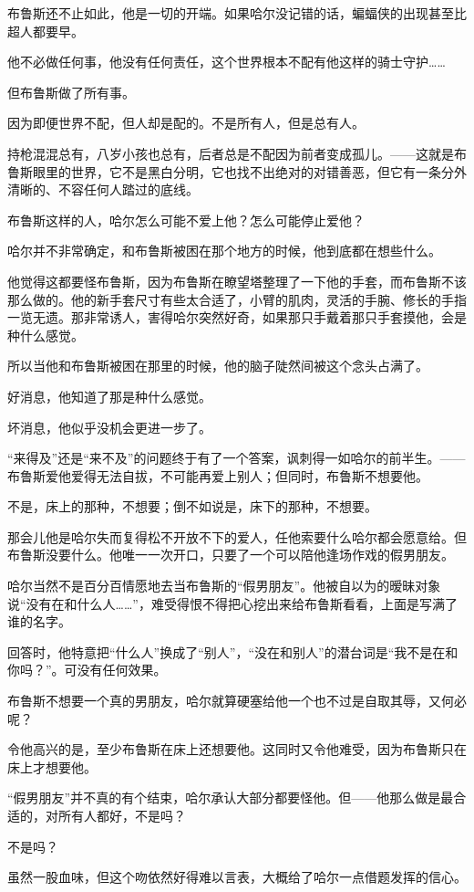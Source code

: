 \documentclass[../main]{subfiles}
\begin{document}
布鲁斯还不止如此，他是一切的开端。如果哈尔没记错的话，蝙蝠侠的出现甚至比超人都要早。

他不必做任何事，他没有任何责任，这个世界根本不配有他这样的骑士守护……

但布鲁斯做了所有事。

因为即便世界不配，但人却是配的。不是所有人，但是总有人。

持枪混混总有，八岁小孩也总有，后者总是不配因为前者变成孤儿。——这就是布鲁斯眼里的世界，它不是黑白分明，它也找不出绝对的对错善恶，但它有一条分外清晰的、不容任何人踏过的底线。

布鲁斯这样的人，哈尔怎么可能不爱上他？怎么可能停止爱他？

哈尔并不非常确定，和布鲁斯被困在那个地方的时候，他到底都在想些什么。

他觉得这都要怪布鲁斯，因为布鲁斯在瞭望塔整理了一下他的手套，而布鲁斯不该那么做的。他的新手套尺寸有些太合适了，小臂的肌肉，灵活的手腕、修长的手指一览无遗。那非常诱人，害得哈尔突然好奇，如果那只手戴着那只手套摸他，会是种什么感觉。

所以当他和布鲁斯被困在那里的时候，他的脑子陡然间被这个念头占满了。

好消息，他知道了那是种什么感觉。

坏消息，他似乎没机会更进一步了。

“来得及”还是“来不及”的问题终于有了一个答案，讽刺得一如哈尔的前半生。——布鲁斯爱他爱得无法自拔，不可能再爱上别人；但同时，布鲁斯不想要他。

不是，床上的那种，不想要；倒不如说是，床下的那种，不想要。

那会儿他是哈尔失而复得松不开放不下的爱人，任他索要什么哈尔都会愿意给。但布鲁斯没要什么。他唯一一次开口，只要了一个可以陪他逢场作戏的假男朋友。

哈尔当然不是百分百情愿地去当布鲁斯的“假男朋友”。他被自以为的暧昧对象说“没有在和什么人\ldots\ldots”，难受得恨不得把心挖出来给布鲁斯看看，上面是写满了谁的名字。

回答时，他特意把“什么人”换成了“别人”，“没在和别人”的潜台词是“我不是在和你吗？”。可没有任何效果。

布鲁斯不想要一个真的男朋友，哈尔就算硬塞给他一个也不过是自取其辱，又何必呢？

令他高兴的是，至少布鲁斯在床上还想要他。这同时又令他难受，因为布鲁斯只在床上才想要他。

“假男朋友”并不真的有个结束，哈尔承认大部分都要怪他。但——他那么做是最合适的，对所有人都好，不是吗？

不是吗？

虽然一股血味，但这个吻依然好得难以言表，大概给了哈尔一点借题发挥的信心。
\end{document}
